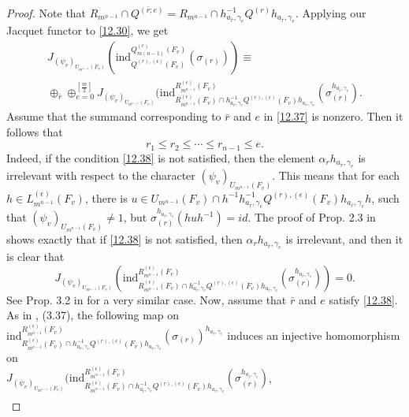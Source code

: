\documentclass[12pts]{amsart}
\newcommand{\ind}{{\mathrm{ind}}}
\begin{document}
\begin{proof}
Note that $R_{m^{n-1}}\cap Q^{(\bar{r};e)}=R_{m^{n-1}}\cap h_{a_{\bar{r}},\gamma_e}^{-1}Q^{(r)}h_{a_{\bar{r}},\gamma_e}$. Applying our Jacquet functor to \eqref{12.30}, we get
\begin{multline}\label{12.37}
J_{(\psi_v)_{U_{m^{n-1}}(F_v)}}(\ind^{Q^{(\epsilon)}_{m(n-1)}(F_v)}_{Q^{(r),(\epsilon)}(F_v)}(\sigma_{(r)}))\equiv\\
 \oplus_{\bar{r}}\oplus_{e=0}^{[\frac{m}{2}]} J_{(\psi_v)_{U_{m^{n-1}}(F_v)}}(\ind^{R^{(\epsilon)}_{m^{n-1}}(F_v)}_{R^{(\epsilon)}_{m^{n-1}}(F_v)\cap h_{a_{\bar{r}},\gamma_e}^{-1}Q^{(r),(\epsilon)}(F_v)h_{a_{\bar{r}},\gamma_e}}(\sigma_{(r)}^{h_{a_{\bar{r}},\gamma_e}}).
\end{multline}
Assume that the summand corresponding to $\bar{r}$ and $e$ in \eqref{12.37} is nonzero. Then it follows that
\begin{equation}\label{12.38}
r_1\leq r_2\leq\cdots\leq r_{n-1}\leq e.
\end{equation} 
Indeed, if the condition \eqref{12.38} is not satisfied, then the element $\alpha_rh_{a_{\bar{r}},\gamma_e}$ is irrelevant with respect to the character $(\psi_v)_{U_{m^{n-1}}(F_v)}$. This means that for each $h\in L^{(\epsilon)}_{m^{n-1}}(F_v)$, there is $u\in U_{m^{n-1}}(F_v)\cap h^{-1}h_{a_{\bar{r}},\gamma_e}^{-1}Q^{(r),(\epsilon)}(F_v)h_{a_{\bar{r}},\gamma_e}h$, such that $(\psi_v)_{U_{m^{n-1}}(F_v)}\neq 1$, but $\sigma_{(r)}^{h_{a_{\bar{r}},\gamma_e}}(huh^{-1})=id$. The proof of Prop. 2.3 in \cite{GS18} shows exactly that if \eqref{12.38} is not satisfied, then $\alpha_rh_{a_{\bar{r}},\gamma_e}$ is irrelevant, and then it is clear that
$$
J_{(\psi_v)_{U_{m^{n-1}}(F_v)}}(\ind^{R^{(\epsilon)}_{m^{n-1}}(F_v)}_{R^{(\epsilon)}_{m^{n-1}}(F_v)\cap h_{a_{\bar{r}},\gamma_e}^{-1}Q^{(r),(\epsilon)}(F_v)h_{a_{\bar{r}},\gamma_e}}(\sigma_{(r)}^{h_{a_{\bar{r}},\gamma_e}}))=0.
$$ 	
See Prop. 3.2 in \cite{GJS15} for a very similar case. Now, assume that $\bar{r}$ and $e$ satisfy \eqref{12.38}. As in \cite{GJS15}, (3.37), the following map on\\ $\ind^{R^{(\epsilon)}_{m^{n-1}}(F_v)}_{R^{(\epsilon)}_{m^{n-1}}(F_v)\cap h_{a_{\bar{r}},\gamma_e}^{-1}Q^{(r),(\epsilon)}(F_v)h_{a_{\bar{r}},\gamma_e}}(\sigma_{(r)})^{h_{a_{\bar{r}},\gamma_e}}$
 induces an injective homomorphism on\\ $J_{(\psi_v)_{U_{m^{n-1}}(F_v)}}(\ind^{R^{(\epsilon)}_{m^{n-1}}(F_v)}_{R^{(\epsilon)}_{m^{n-1}}(F_v)\cap h_{a_{\bar{r}},\gamma_e}^{-1}Q^{(r),(\epsilon)}(F_v)h_{a_{\bar{r}},\gamma_e}}(\sigma_{(r)}^{h_{a_{\bar{r}},\gamma_e}})$,
\begin{multline}\label{12.39}

\end{multline}
\end{proof}
\end{document}
